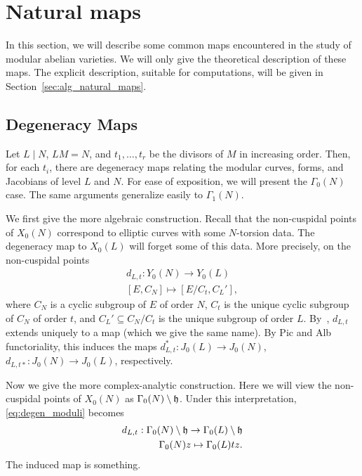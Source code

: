 \documentclass[11pt, proquest]{uwthesis}
\begin{document}
\section{Natural maps}%
\label{sec:natural_maps}

In this section, we will describe some common maps encountered in the study of
modular abelian varieties. We will only give the theoretical description of
these maps. The explicit description, suitable for computations, will be given
in Section~\ref{sec:alg_natural_maps}.

\subsection{Degeneracy Maps}%
\label{sub:degeneracy_maps} 

Let $L\mid N$, $LM=N$, and $t_1,\ldots,t_r$ be the divisors of $M$ in
increasing order. Then, for each $t_i$, there are degeneracy maps relating the
modular curves, forms, and Jacobians of level $L$ and $N$. For ease of
exposition, we will present the $\Gamma_0(N)$ case. The same arguments
generalize easily to $\Gamma_1(N)$.

We first give the more algebraic construction. Recall that the non-cuspidal
points of $X_0(N)$ correspond to elliptic curves with some $N$-torsion data.
The degeneracy map to $X_0(L)$ will forget some of this data. More precisely,
on the non-cuspidal points
\begin{equation}
    \label{eq:degen_moduli}
    \begin{split}
        d_{L,t}: Y_0(N)  \to Y_0(L) \\
        [ E, C_N ]       \mapsto [ E/C_t, C_L ' ],
    \end{split}
\end{equation}
where $C_N$ is a cyclic subgroup of $E$ of order $N$, $C_t$ is the unique
cyclic subgroup of $C_N$ of order $t$, and $C_L '\subseteq C_N/C_t$ is the
unique subgroup of order $L$. By~\cite[Chap. 1, Prop. 6.8]{hartshorne},
$d_{L,t}$ extends uniquely to a map (which we give the same name). By Pic and
Alb functoriality, this induces the maps $d_{L,t} ^*:J_0(L)\to J_0(N)$, $d_{L,
t*} :J_0(N)\to J_0(L)$, respectively. 

Now we give the more complex-analytic construction. Here we will view the
non-cuspidal points of $X_0(N)$ as $\Gamma_0(N)\setminus \mathfrak{h}$. Under this
interpretation, \eqref{eq:degen_moduli} becomes
\begin{equation}
    \label{eq:degen_analytic}
    \begin{split}
        d_{L,t}: \Gamma_0(N)\setminus \mathfrak{h} \to \Gamma_0(L)\setminus \mathfrak{h} \\
        \Gamma_0(N)z\mapsto \Gamma_0(L) tz.
    \end{split}
\end{equation}
The induced map is something.
\end{document}
